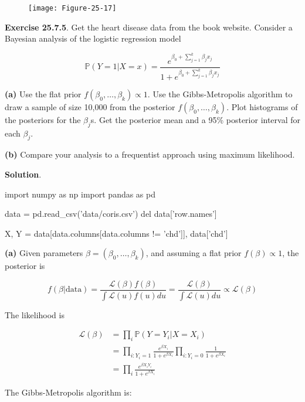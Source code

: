 \begin{figure}[H]
\centering
\texttt{[image: Figure-25-17]}
\end{figure}

\textbf{Exercise 25.7.5}. Get the heart disease data from the book
website. Consider a Bayesian analysis of the logistic regression model

\[ \mathbb{P}(Y = 1 | X = x) = \frac{e^{ \beta_{0} + \sum_{j=1}^{k} \beta_{j} x_{j} } }{1 + e^{ \beta_{0} + \sum_{j=1}^{k} \beta_{j} x_{j} }} \]

\textbf{(a)} Use the flat prior
\(f(\beta_{0}, \dots, \beta_{k}) \propto 1\). Use the Gibbs-Metropolis
algorithm to draw a sample of size 10,000 from the posterior
\(f(\beta_{0}, \dots, \beta_{k})\). Plot histograms of the posteriors for
the \(\beta_{j}\)s. Get the posterior mean and a 95\% posterior interval
for each \(\beta_{j}\).

\textbf{(b)} Compare your analysis to a frequentist approach using
maximum likelihood.

\textbf{Solution}.

\begin{python}
import numpy as np
import pandas as pd

data = pd.read_csv('data/coris.csv')
del data['row.names']

X, Y = data[data.columns[data.columns != 'chd']], data['chd']
\end{python}

\textbf{(a)} Given parameters \(\beta = (\beta_{0}, \dots, \beta_{k})\), and
assuming a flat prior \(f(\beta) \propto 1\), the posterior is

\[ f(\beta | \text{data}) = \frac{\mathcal{L}(\beta) f(\beta)}{\int \mathcal{L}(u) f(u) du} = \frac{\mathcal{L}(\beta)}{\int \mathcal{L}(u) du} \propto \mathcal{L}(\beta) \]

The likelihood is

\begin{align*}
\mathcal{L}(\beta) &= \prod_{i} \mathbb{P}(Y = Y_{i} | X = X_{i})  \\
&= \prod_{i: Y_{i} = 1} \frac{e^{ \beta X_{i} } }{1 + e^{ \beta X_{i} }} \prod_{i: Y_{i} = 0} \frac{1}{1 + e^{ \beta X_{i} }} \\
&= \prod_{i} \frac{e^{ \beta X_{i} Y_{i} } }{1 + e^{ \beta X_{i} }}
\end{align*}

The Gibbs-Metropolis algorithm is:

